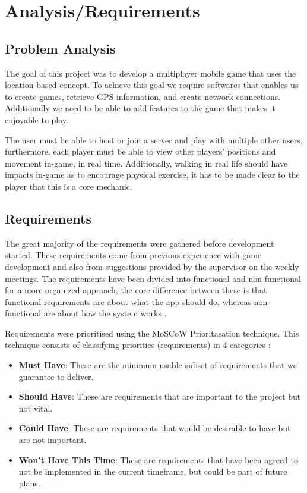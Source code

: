 \documentclass{dissertation}
\begin{document}
\chapter{Analysis/Requirements}

\section{Problem Analysis}
The goal of this project was to develop a multiplayer mobile game that uses the location based concept. To achieve this goal we require softwares that enables us to create games, 
retrieve GPS information, and create network connections. Additionally we need to be able to add features to the game that makes it enjoyable to play.

The user must be able to host or join a server and play with multiple other users, furthermore, each player must be able to view other players' positions and movement in-game, in real time. Additionally, walking in real life should have impacts in-game as to encourage physical exercise, it has to be made clear to the player that this is a core mechanic.

\section{Requirements}
The great majority of the requirements were gathered before development started. These requirements come from previous experience with game development and also from 
suggestions provided by the supervisor on the weekly meetings. The requirements have been divided into functional and non-functional for a more organized approach, the core 
difference between these is that functional requirements are about what the app should do, whereas non-functional are about how the system works \citep{Eriksson12}.

Requirements were prioritised using the MoSCoW Prioritasation technique. This technique consists of classifying priorities (requirements) in 4 categories \citep{moscow21}:

\begin{itemize}
	\item \textbf{Must Have}: These are the minimum usable subset of requirements that we guarantee to deliver.
	\item \textbf{Should Have}: These are requirements that are important to the project but not vital.
	\item \textbf{Could Have}: These are requirements that would be desirable to have but are not important.
	\item \textbf{Won't Have This Time}: These are requirements that have been agreed to not be implemented in the current timeframe, but could be part of future plans.
\end{itemize}
\end{document}
